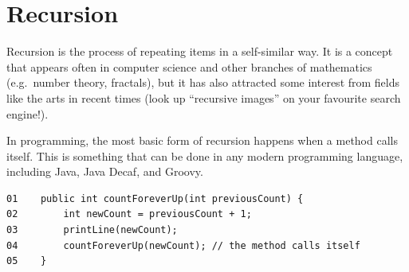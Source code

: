 \section{Recursion}
\label{sec:recursion}

Recursion is the process of repeating items in a self-similar way. It
is a concept that appears often in computer science and other branches
of mathematics (e.g.~number theory, fractals), but it has also
attracted some interest from fields like the arts in recent times
(look up ``recursive images'' on your favourite search engine!). 

In programming, the most basic form of recursion happens when a method
calls itself. This is something that can be done in any modern 
programming language, including
Java, Java Decaf, and Groovy. 

% 
%
%
%

\label{neverends}
\begin{verbatim}
01    public int countForeverUp(int previousCount) {
02        int newCount = previousCount + 1;
03        printLine(newCount);
04        countForeverUp(newCount); // the method calls itself
05    }
\end{verbatim}

